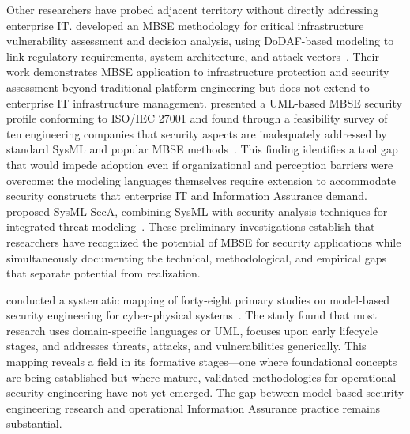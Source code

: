 Other researchers have probed adjacent territory without directly addressing enterprise IT\@. \citeauthor{Huff_Medal_2019} developed an MBSE methodology for critical infrastructure vulnerability assessment and decision analysis, using DoDAF-based modeling to link regulatory requirements, system architecture, and attack vectors~\parencite{Huff_Medal_2019}. Their work demonstrates MBSE application to infrastructure protection and security assessment beyond traditional platform engineering but does not extend to enterprise IT infrastructure management. \citeauthor{Mazeika_Butleris_2020} presented a UML-based MBSE security profile conforming to ISO/IEC 27001 and found through a feasibility survey of ten engineering companies that security aspects are inadequately addressed by standard SysML and popular MBSE methods~\parencite{Mazeika_Butleris_2020}. This finding identifies a tool gap that would impede adoption even if organizational and perception barriers were overcome: the modeling languages themselves require extension to accommodate security constructs that enterprise IT and Information Assurance demand. \citeauthor{Apvrille_Roudier_2015} proposed SysML-SecA, combining SysML with security analysis techniques for integrated threat modeling~\parencite{Apvrille_Roudier_2015}. These preliminary investigations establish that researchers have recognized the potential of MBSE for security applications while simultaneously documenting the technical, methodological, and empirical gaps that separate potential from realization.

\citeauthor{Nguyen_Ali_Yue_2017} conducted a systematic mapping of forty-eight primary studies on model-based security engineering for cyber-physical systems~\parencite{Nguyen_Ali_Yue_2017}. The study found that most research uses domain-specific languages or UML, focuses upon early lifecycle stages, and addresses threats, attacks, and vulnerabilities generically. This mapping reveals a field in its formative stages---one where foundational concepts are being established but where mature, validated methodologies for operational security engineering have not yet emerged. The gap between model-based security engineering research and operational Information Assurance practice remains substantial.

